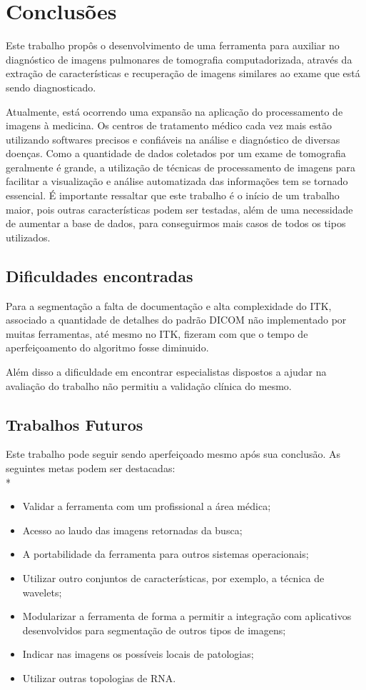 \chapter{Conclusões}

Este trabalho propôs o desenvolvimento de uma ferramenta para auxiliar no diagnóstico de imagens pulmonares de tomografia computadorizada, através da extração de características e recuperação de imagens similares ao exame que está sendo diagnosticado.

Atualmente, está ocorrendo uma expansão na aplicação do processamento de imagens à medicina. Os centros de tratamento médico cada vez mais estão utilizando softwares precisos e confiáveis na análise e diagnóstico de diversas doenças. Como a quantidade de dados coletados por um exame de tomografia geralmente é grande, a utilização de técnicas de processamento de imagens para facilitar a visualização e análise automatizada das informações tem se tornado essencial. É importante ressaltar que este trabalho é o início de um trabalho maior, pois outras características podem ser testadas, além de uma necessidade de aumentar a base de dados, para conseguirmos mais casos de todos os tipos utilizados.

\section{Dificuldades encontradas}

Para a segmentação a falta de documentação e alta complexidade do ITK, associado a quantidade de detalhes do padrão DICOM não implementado por muitas ferramentas, até mesmo no ITK, fizeram com que o tempo de aperfeiçoamento do algoritmo fosse diminuido.

Além disso a dificuldade em encontrar especialistas dispostos a ajudar na avaliação do trabalho não permitiu a validação clínica do mesmo.

\section{Trabalhos Futuros}

Este trabalho pode seguir sendo aperfeiçoado mesmo após sua conclusão. As seguintes metas podem ser destacadas:
\\*
\begin{itemize}
 \item Validar a ferramenta com um profissional a área médica;
 \item Acesso ao laudo das imagens retornadas da busca;
 \item A portabilidade da ferramenta para outros sistemas operacionais;
 \item Utilizar outro conjuntos de características, por exemplo, a técnica de wavelets;
 \item Modularizar a ferramenta de forma a permitir a integração com aplicativos desenvolvidos para segmentação de outros tipos de imagens;
 \item Indicar nas imagens os possíveis locais de patologias;
 \item Utilizar outras topologias de RNA.
\end{itemize}

